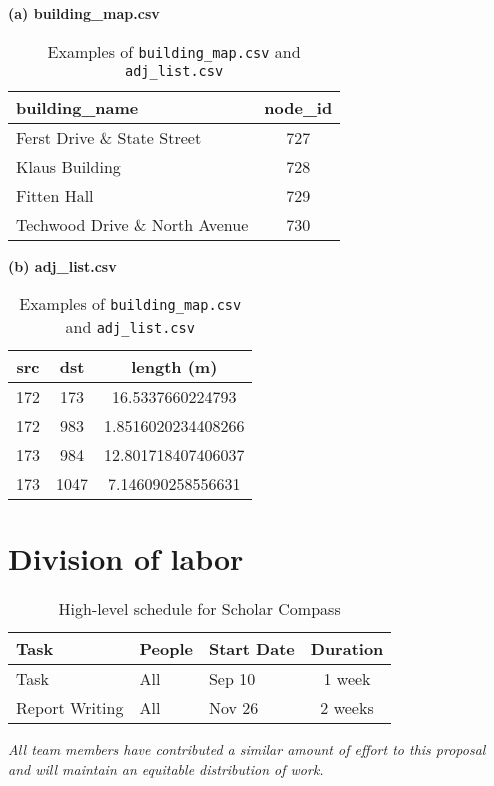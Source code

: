 \documentclass[fleqn,10pt]{olplainarticle}
\begin{document}
\begin{table}[h]
\centering
\begin{minipage}[t]{0.45\textwidth}
\centering
\textbf{(a) building\_map.csv}\\[4pt]
\begin{tabular}{l c}
\hline
\textbf{building\_name} & \textbf{node\_id} \\
\hline
Ferst Drive \& State Street & 727 \\
Klaus Building & 728 \\
Fitten Hall & 729 \\
Techwood Drive \& North Avenue & 730 \\
\hline
\end{tabular}
\end{minipage}
\hfill
\begin{minipage}[t]{0.45\textwidth}
\centering
\textbf{(b) adj\_list.csv}\\[4pt]
\begin{tabular}{c c c}
\hline
\textbf{src} & \textbf{dst} & \textbf{length (m)} \\
\hline
172 & 173 & 16.5337660224793 \\
172 & 983 & 1.8516020234408266 \\
173 & 984 & 12.801718407406037 \\
173 & 1047 & 7.146090258556631 \\
\hline
\end{tabular}
\end{minipage}
\caption[b]{Examples of \texttt{building\_map.csv} and \texttt{adj\_list.csv}}
\end{table}


\section*{Division of labor}
\begin{table}[h]
  \centering
  \begin{tabular}{l l l c}
    \toprule
    \textbf{Task} & \textbf{People} & \textbf{Start Date} & \textbf{Duration} \\
    \midrule
    Task & All & Sep 10 & 1 week \\
    Report Writing & All & Nov 26 & 2 weeks \\
    \bottomrule
  \end{tabular}
  \caption{High-level schedule for Scholar Compass}
  \label{tab:schedule}
  \vspace{0ex}
  \noindent\textit{All team members have contributed a similar amount of effort to this proposal and will maintain an equitable distribution of work.}
\end{table}
\newpage
\end{document}
